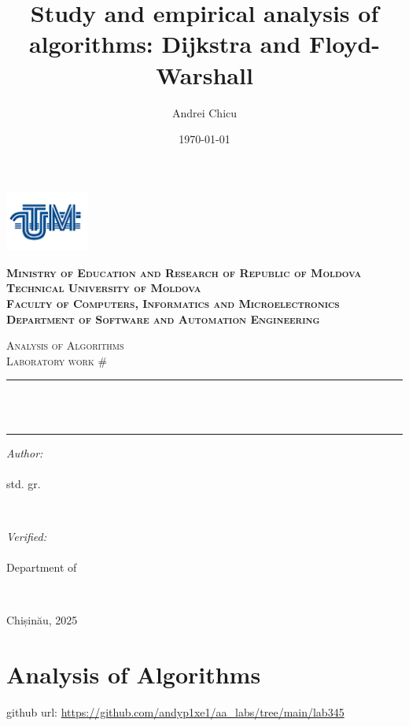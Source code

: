 \documentclass[a4paper,12pt]{article}
\author{Andrei Chicu}
\date{\today}
\title{Study and empirical analysis of algorithms: Dijkstra and Floyd-Warshall}
\begin{document}
\makeatletter
\begin{titlepage}
\centering

\includegraphics[height=2cm]{utm_logo.png}

\bfseries
\textsc{Ministry of Education and Research of Republic of Moldova} \\
\textsc{Technical University of Moldova} \\
\textsc{Faculty of Computers, Informatics and Microelectronics} \\
\textsc{Department of Software and Automation Engineering} \\
\mdseries

\vfill

\textsc{\Large Analysis of Algorithms} \\
\textsc{\large Laboratory work \#\@labno}\\[0.5cm]

\vspace{12pt}
\newcommand{\HRule}{\rule{\linewidth}{0.5mm}}
\HRule \\[0.2cm]
{ \LARGE \bfseries \@title }\\[0.4cm]
\HRule
\vfill

\begin{minipage}[t]{0.4\textwidth}
\begin{flushleft} \large
\emph{Author:} \\
\@author\\                        
std. gr. \@group
\end{flushleft}
\end{minipage}
~
\begin{minipage}[t]{0.4\textwidth}
\raggedleft \large
\emph{Verified:} \\
\@prof \\
Department of \textsc{\@profdep}
\end{minipage}\\[3cm]
\vfill

Chișinău, 2025
\end{titlepage}
\makeatother
\setcounter{page}{2}
\section{Analysis of Algorithms}
\label{sec:orgdb7924b}
github url: \url{https://github.com/andyp1xe1/aa_labs/tree/main/lab345}
\end{document}
